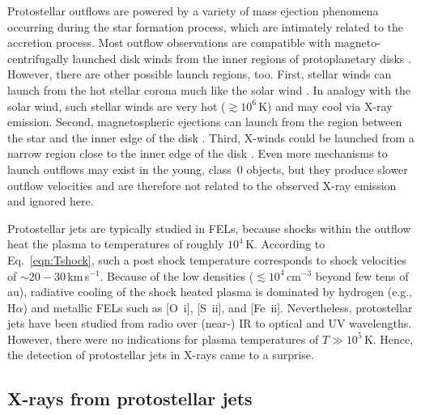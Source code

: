Protostellar outflows are powered by a variety of mass ejection phenomena occurring during the star formation process, which are intimately related to the accretion process. 
Most outflow observations are compatible with magneto-centrifugally launched disk winds from the inner regions of protoplanetary disks \citep[roughly 0.1\,au to 10\,au, see][]{Frank_2014}. However, there are other possible launch regions, too. First, stellar winds can launch from the hot stellar corona much like the solar wind \citep{Matt_2005}. In analogy with the solar wind, such stellar winds are very hot ($\gtrsim10^6$\,K) and may cool via X-ray emission. Second, magnetospheric ejections can launch from the region between the star and the inner edge of the disk \citep{Zanni_2013}. Third, X-winds could be launched from a narrow region close to the inner edge of the disk \citep{Shu_1994}. Even more mechanisms to launch outflows may exist  in the young, class~0 objects, but they produce slower outflow velocities and are therefore not related to the observed X-ray emission and ignored here.

Protostellar jets are typically studied in FELs, because shocks within the outflow heat the plasma to temperatures of roughly $10^4\,$K. According to Eq.~\ref{eqn:Tshock}, such a post shock temperature corresponds to shock velocities of $\sim20-30$\,km\,s$^{-1}$.
%
Because of the low densities ($\lesssim10^4\,$cm$^{-3}$ beyond few tens of au), radiative cooling of the shock heated plasma is dominated by hydrogen (e.g., H$\alpha$) and metallic FELs such as [O~{\sc i}], [S~{\sc ii}], and [Fe~{\sc ii}].
Nevertheless, protostellar jets have been studied from radio over (near-) IR to optical and UV wavelengths.
However, there were no indications for plasma temperatures of $T\gg10^5\,$K. Hence, the detection of protostellar jets in X-rays came to a surprise.

% 
% 
% 
% 

\subsection{X-rays from protostellar jets}

